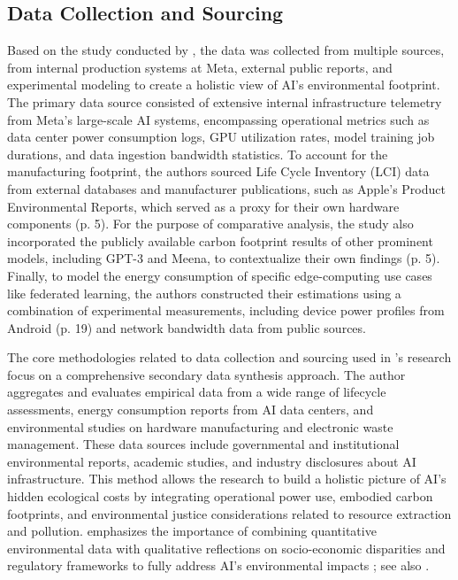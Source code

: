 \documentclass[a4paper, 12pt]{article}
\begin{document}
\subsection{Data Collection and Sourcing}
Based on the study conducted by \citet{Wu2022}, the data was collected from multiple sources, from internal production systems at Meta, external public reports, and experimental modeling to create a holistic view of AI's environmental footprint. The primary data source consisted of extensive internal infrastructure telemetry from Meta's large-scale AI systems, encompassing operational metrics such as data center power consumption logs, GPU utilization rates, model training job durations, and data ingestion bandwidth statistics. To account for the manufacturing footprint, the authors sourced Life Cycle Inventory (LCI) data from external databases and manufacturer publications, such as Apple's Product Environmental Reports, which served as a proxy for their own hardware components (p. 5). For the purpose of comparative analysis, the study also incorporated the publicly available carbon footprint results of other prominent models, including GPT-3 and Meena, to contextualize their own findings (p. 5). Finally, to model the energy consumption of specific edge-computing use cases like federated learning, the authors constructed their estimations using a combination of experimental measurements, including device power profiles from Android (p. 19) and network bandwidth data from public sources.\hfill \break
\par The core methodologies related to data collection and sourcing used in \citet{Zhuk2023}'s research focus on a comprehensive secondary data synthesis approach. The author aggregates and evaluates empirical data from a wide range of lifecycle assessments, energy consumption reports from AI data centers, and environmental studies on hardware manufacturing and electronic waste management. These data sources include governmental and institutional environmental reports, academic studies, and industry disclosures about AI infrastructure. This method allows the research to build a holistic picture of AI’s hidden ecological costs by integrating operational power use, embodied carbon footprints, and environmental justice considerations related to resource extraction and pollution. \citet{Zhuk2023} emphasizes the importance of combining quantitative environmental data with qualitative reflections on socio-economic disparities and regulatory frameworks to fully address AI’s environmental impacts \citep[pp.~20--22]{Zhuk2023}; see also \citep{OECD2022, MIT2025}. \hfill \break
\end{document}
